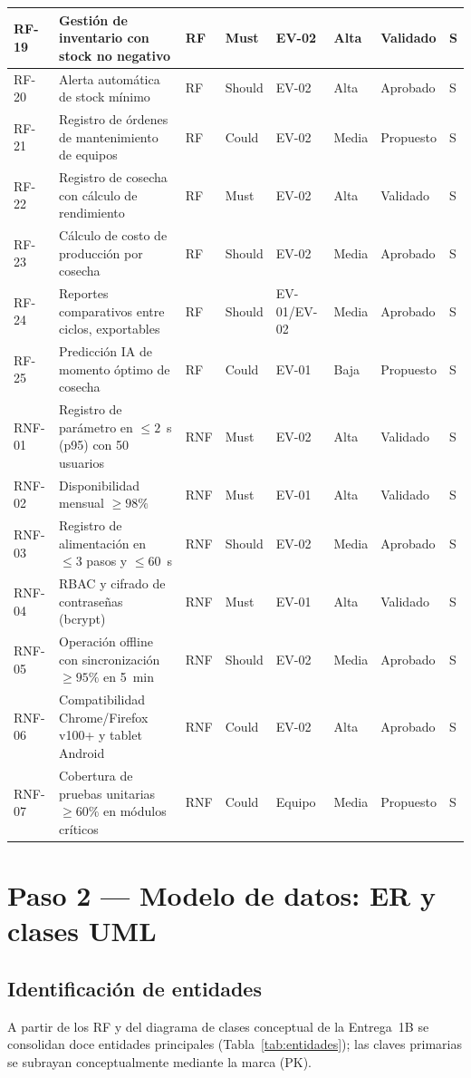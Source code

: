 \documentclass[11pt,a4paper]{article}
\renewcommand{\_}{\textunderscore\allowbreak}
\begin{document}
\begin{landscape}
\begin{longtable}{|p{1.3cm}|p{6.0cm}|p{1.1cm}|p{1.9cm}|p{2.3cm}|p{2.2cm}|p{1.9cm}|p{1.7cm}|}
\hline
RF-19 & Gestión de inventario con stock no negativo & RF & Must & EV-02 & Alta & Validado & S\\
\hline
RF-20 & Alerta automática de stock mínimo & RF & Should & EV-02 & Alta & Aprobado & S\\
\hline
RF-21 & Registro de órdenes de mantenimiento de equipos & RF & Could & EV-02 & Media & Propuesto & S\\
\hline
RF-22 & Registro de cosecha con cálculo de rendimiento & RF & Must & EV-02 & Alta & Validado & S\\
\hline
RF-23 & Cálculo de costo de producción por cosecha & RF & Should & EV-02 & Media & Aprobado & S\\
\hline
RF-24 & Reportes comparativos entre ciclos, exportables & RF & Should & EV-01/EV-02 & Media & Aprobado & S\\
\hline
RF-25 & Predicción IA de momento óptimo de cosecha & RF & Could & EV-01 & Baja & Propuesto & S\\
\hline
RNF-01 & Registro de parámetro en $\leq 2$~s (p95) con 50 usuarios & RNF & Must & EV-02 & Alta & Validado & S\\
\hline
RNF-02 & Disponibilidad mensual $\geq 98\%$ & RNF & Must & EV-01 & Alta & Validado & S\\
\hline
RNF-03 & Registro de alimentación en $\leq 3$ pasos y $\leq 60$~s & RNF & Should & EV-02 & Media & Aprobado & S\\
\hline
RNF-04 & RBAC y cifrado de contraseñas (bcrypt) & RNF & Must & EV-01 & Alta & Validado & S\\
\hline
RNF-05 & Operación offline con sincronización $\geq 95\%$ en 5~min & RNF & Should & EV-02 & Media & Aprobado & S\\
\hline
RNF-06 & Compatibilidad Chrome/Firefox v100+ y tablet Android & RNF & Could & EV-02 & Alta & Aprobado & S\\
\hline
RNF-07 & Cobertura de pruebas unitarias $\geq 60\%$ en módulos críticos & RNF & Could & Equipo & Media & Propuesto & S\\

\end{longtable}
\end{landscape}

\section{Paso 2 --- Modelo de datos: ER y clases UML}
\subsection{Identificación de entidades}
A partir de los RF y del diagrama de clases conceptual de la Entrega~1B se consolidan doce entidades principales (Tabla~\ref{tab:entidades}); las claves primarias se subrayan conceptualmente mediante la marca (PK).
\end{document}
